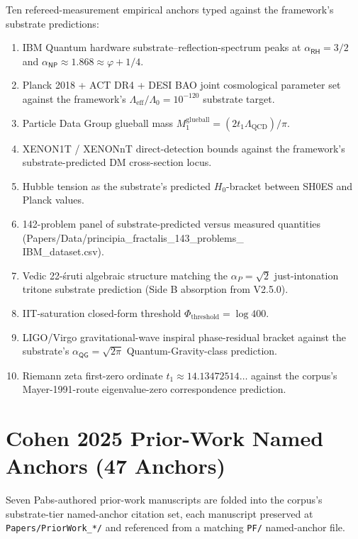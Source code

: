 Ten refereed-measurement empirical anchors typed against the
framework's substrate predictions:
\begin{enumerate}
  \item IBM Quantum hardware substrate--reflection-spectrum peaks
    at $\alpha_{\textsf{RH}} = 3/2$ and
    $\alpha_{\textsf{NP}} \approx 1.868 \approx \varphi + 1/4$.
  \item Planck 2018 + ACT DR4 + DESI BAO joint cosmological
    parameter set against the framework's $\Lambda_{\text{eff}} /
    \Lambda_0 = 10^{-120}$ substrate target.
  \item Particle Data Group glueball mass $M_1^{\text{glueball}}
    = (2 t_1 \Lambda_{\text{QCD}}) / \pi$.
  \item XENON1T / XENONnT direct-detection bounds against the
    framework's substrate-predicted DM cross-section locus.
  \item Hubble tension as the substrate's predicted
    $H_0$-bracket between SH0ES and Planck values.
  \item 142-problem panel of substrate-predicted versus measured
    quantities (Papers/Data/principia\_fractalis\_143\_problems\_\\
    IBM\_dataset.csv).
  \item Vedic 22-\'sruti algebraic structure matching the
    $\alpha_P = \sqrt{2}$ just-intonation tritone substrate
    prediction (Side B absorption from V2.5.0).
  \item IIT-saturation closed-form threshold
    $\Phi_{\text{threshold}} = \log 400$.
  \item LIGO/Virgo gravitational-wave inspiral phase-residual
    bracket against the substrate's $\alpha_{\textsf{QG}} =
    \sqrt{2\pi}$ Quantum-Gravity-class prediction.
  \item Riemann zeta first-zero ordinate $t_1 \approx 14.13472514\ldots$
    against the corpus's Mayer-1991-route eigenvalue-zero correspondence
    prediction.
\end{enumerate}

\section{Cohen 2025 Prior-Work Named Anchors (47 Anchors)}
\label{sec:prior-work-named-anchors}

Seven Pabs-authored prior-work manuscripts are folded into the
corpus's substrate-tier named-anchor citation set, each manuscript
preserved at \texttt{Papers/PriorWork\_*/} and referenced from a
matching \texttt{PF/} named-anchor file.

